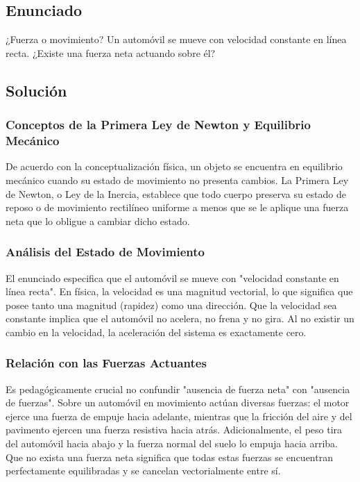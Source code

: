 \documentclass[12pt]{article}
\begin{document}
\subsection*{Enunciado}
¿Fuerza o movimiento? Un automóvil se mueve con velocidad constante en línea recta. ¿Existe una fuerza neta actuando sobre él?

\subsection*{Solución}

\subsubsection*{Conceptos de la Primera Ley de Newton y Equilibrio Mecánico}
De acuerdo con la conceptualización física, un objeto se encuentra en equilibrio mecánico cuando su estado de movimiento no presenta cambios. La Primera Ley de Newton, o Ley de la Inercia, establece que todo cuerpo preserva su estado de reposo o de movimiento rectilíneo uniforme a menos que se le aplique una fuerza neta que lo obligue a cambiar dicho estado. 

\subsubsection*{Análisis del Estado de Movimiento}
El enunciado especifica que el automóvil se mueve con "velocidad constante en línea recta". En física, la velocidad es una magnitud vectorial, lo que significa que posee tanto una magnitud (rapidez) como una dirección. Que la velocidad sea constante implica que el automóvil no acelera, no frena y no gira. Al no existir un cambio en la velocidad, la aceleración del sistema es exactamente cero.

\subsubsection*{Relación con las Fuerzas Actuantes}
Es pedagógicamente crucial no confundir "ausencia de fuerza neta" con "ausencia de fuerzas". Sobre un automóvil en movimiento actúan diversas fuerzas: el motor ejerce una fuerza de empuje hacia adelante, mientras que la fricción del aire y del pavimento ejercen una fuerza resistiva hacia atrás. Adicionalmente, el peso tira del automóvil hacia abajo y la fuerza normal del suelo lo empuja hacia arriba. Que no exista una fuerza neta significa que todas estas fuerzas se encuentran perfectamente equilibradas y se cancelan vectorialmente entre sí.
\end{document}
